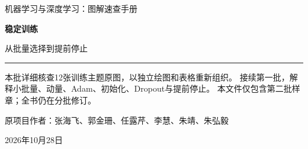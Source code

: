 \documentclass[a4paper,11pt,oneside,openany]{book}
\begin{document}
\frontmatter
\hypersetup{pageanchor=false}
\begin{titlepage}
\vspace*{16mm}
{\sffamily\color{Teal}\large 机器学习与深度学习：图解速查手册\par}
\vspace{15mm}
{\sffamily\bfseries\color{Ink}\Huge 稳定训练\par}
\vspace{6mm}
{\sffamily\color{Ink}\LARGE 从批量选择到提前停止\par}
\vspace{12mm}
\noindent\textcolor{Teal}{\rule{\textwidth}{1.2pt}}
\vspace{7mm}
\begin{keyidea}[第二批验收样章]
本批详细核查12张训练主题原图，以独立绘图和表格重新组织。
接续第一批，解释小批量、动量、Adam、初始化、Dropout与提前停止。
本文件仅包含第二批样章；全书仍在分批修订。
\end{keyidea}
\vfill
原项目作者：张海飞、郭金珊、任露芹、李慧、朱靖、朱弘毅\par
\vspace{4mm}
2026年10月28日\par
\end{titlepage}
\hypersetup{pageanchor=true}
\tableofcontents
\mainmatter
\setcounter{chapter}{1}

\end{document}
